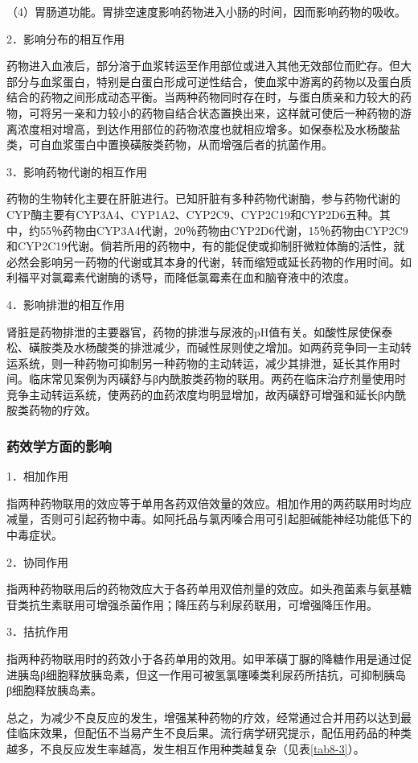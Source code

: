（4）胃肠道功能。胃排空速度影响药物进入小肠的时间，因而影响药物的吸收。

2．影响分布的相互作用

药物进入血液后，部分溶于血浆转运至作用部位或进入其他无效部位而贮存。但大部分与血浆蛋白，特别是白蛋白形成可逆性结合，使血浆中游离的药物以及蛋白质结合的药物之间形成动态平衡。当两种药物同时存在时，与蛋白质亲和力较大的药物，可将另一亲和力较小的药物自结合状态置换出来，这样就可使后一种药物的游离浓度相对增高，到达作用部位的药物浓度也就相应增多。如保泰松及水杨酸盐类，可自血浆蛋白中置换磺胺类药物，从而增强后者的抗菌作用。

3．影响药物代谢的相互作用

药物的生物转化主要在肝脏进行。已知肝脏有多种药物代谢酶，参与药物代谢的CYP酶主要有CYP3A4、CYP1A2、CYP2C9、CYP2C19和CYP2D6五种。其中，约55％药物由CYP3A4代谢，20％药物由CYP2D6代谢，15％药物由CYP2C9和CYP2C19代谢。倘若所用的药物中，有的能促使或抑制肝微粒体酶的活性，就必然会影响另一药物的代谢或其本身的代谢，转而缩短或延长药物的作用时间。如利福平对氯霉素代谢酶的诱导，而降低氯霉素在血和脑脊液中的浓度。

4．影响排泄的相互作用

肾脏是药物排泄的主要器官，药物的排泄与尿液的pH值有关。如酸性尿使保泰松、磺胺类及水杨酸类的排泄减少，而碱性尿则使之增加。如两药竞争同一主动转运系统，则一种药物可抑制另一种药物的主动转运，减少其排泄，延长其作用时间。临床常见案例为丙磺舒与β内酰胺类药物的联用。两药在临床治疗剂量使用时竞争主动转运系统，使两药的血药浓度均明显增加，故丙磺舒可增强和延长β内酰胺类药物的疗效。

\subsubsection{药效学方面的影响}

1．相加作用

指两种药物联用的效应等于单用各药双倍效量的效应。相加作用的两药联用时均应减量，否则可引起药物中毒。如阿托品与氯丙嗪合用可引起胆碱能神经功能低下的中毒症状。

2．协同作用

指两种药物联用后的药物效应大于各药单用双倍剂量的效应。如头孢菌素与氨基糖苷类抗生素联用可增强杀菌作用；降压药与利尿药联用，可增强降压作用。

3．拮抗作用

指两种药物联用时的药效小于各药单用的效用。如甲苯磺丁脲的降糖作用是通过促进胰岛β细胞释放胰岛素，但这一作用可被氢氯噻嗪类利尿药所拮抗，可抑制胰岛β细胞释放胰岛素。

总之，为减少不良反应的发生，增强某种药物的疗效，经常通过合并用药以达到最佳临床效果，但配伍不当易产生不良后果。流行病学研究提示，配伍用药品的种类越多，不良反应发生率越高，发生相互作用种类越复杂（见表\ref{tab8-3}）。

